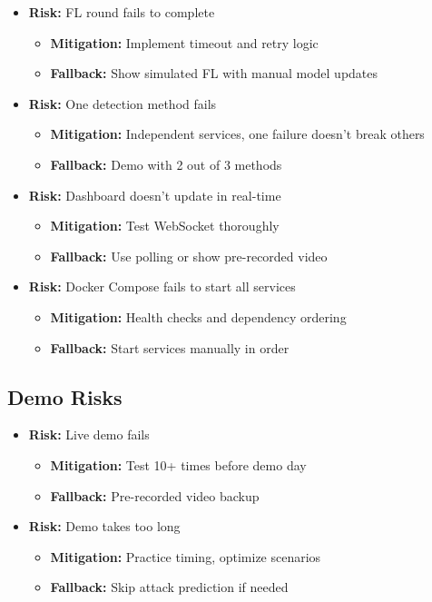 \documentclass[12pt,a4paper]{article}
\begin{document}
\begin{itemize}[leftmargin=1cm,itemsep=0pt]
    \item \textbf{Risk:} FL round fails to complete
    \begin{itemize}
        \item \textbf{Mitigation:} Implement timeout and retry logic
        \item \textbf{Fallback:} Show simulated FL with manual model updates
    \end{itemize}
    
    \item \textbf{Risk:} One detection method fails
    \begin{itemize}
        \item \textbf{Mitigation:} Independent services, one failure doesn't break others
        \item \textbf{Fallback:} Demo with 2 out of 3 methods
    \end{itemize}
    
    \item \textbf{Risk:} Dashboard doesn't update in real-time
    \begin{itemize}
        \item \textbf{Mitigation:} Test WebSocket thoroughly
        \item \textbf{Fallback:} Use polling or show pre-recorded video
    \end{itemize}
    
    \item \textbf{Risk:} Docker Compose fails to start all services
    \begin{itemize}
        \item \textbf{Mitigation:} Health checks and dependency ordering
        \item \textbf{Fallback:} Start services manually in order
    \end{itemize}
\end{itemize}

\subsection{Demo Risks}

\begin{itemize}[leftmargin=1cm,itemsep=0pt]
    \item \textbf{Risk:} Live demo fails
    \begin{itemize}
        \item \textbf{Mitigation:} Test 10+ times before demo day
        \item \textbf{Fallback:} Pre-recorded video backup
    \end{itemize}
    
    \item \textbf{Risk:} Demo takes too long
    \begin{itemize}
        \item \textbf{Mitigation:} Practice timing, optimize scenarios
        \item \textbf{Fallback:} Skip attack prediction if needed
    \end{itemize}
\end{itemize}
\end{document}

